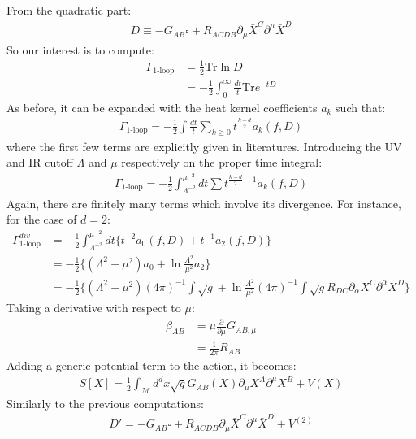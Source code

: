 \documentclass[fleqn]{article}
\begin{document}
From the quadratic part:
\begin{align}
D \equiv -G_{AB} \square + R_{ACDB} \partial _{\mu} \bar{X}^{C} \partial ^{\mu} \bar{X}^{D}
\end{align}
So our interest is to compute:
\begin{align}
\Gamma_{\text{1-loop}} &= \frac{1}{2} \text{Tr} \ln D  \nonumber \\
& = -\frac{1}{2} \int _{0} ^{\infty} \frac{dt}{t} \text{Tr} e^{-tD}
\end{align}
As before, it can be expanded with the heat kernel coefficients $a_{k}$ such that:
\begin{align}
\Gamma _{\text{1-loop}} = -\frac{1}{2} \int \frac{dt}{t} \sum _{k\geq 0} t^{\frac{k-d}{2}}a_{k}(f,D)
\end{align}
where the first few terms are explicitly given in literatures. Introducing the UV and IR cutoff $\Lambda$ and $\mu$ respectively on the proper time integral:
\begin{align}
\Gamma _{\text{1-loop}} = -\frac{1}{2}\int _{\Lambda ^{-2}} ^{\mu ^{-2}} dt \sum t^{\frac{k-d}{2} -1} a_{k}(f,D)
\end{align}
Again, there are finitely many terms which involve its divergence. For instance, for the case of $d=2$:
\begin{align}
\Gamma _{\text{1-loop}}^{div} &= -\frac{1}{2} \int _{\Lambda ^{-2}} ^{\mu ^{-2}} dt\lbrace t^{-2} a_{0} (f,D) + t^{-1} a_{2} (f,D) \rbrace \nonumber \\
&= -\frac{1}{2} \lbrace (\Lambda ^{2} - \mu ^{2} )a_{0} + \ln \frac{\Lambda ^{2}}{\mu ^{2}} a_{2} \rbrace \nonumber \\
&= -\frac{1}{2} \lbrace (\Lambda ^{2} - \mu ^{2})(4\pi)^{-1} \int \sqrt{g} + \ln \frac{\Lambda ^{2}}{\mu ^{2}} (4\pi)^{-1} \int \sqrt{g} R_{DC} \partial _{\alpha} X^{C} \partial ^{\alpha} X^{D} \rbrace 
\end{align}
Taking a derivative with respect to $\mu$:
\begin{align}
\beta _{AB} &= \mu \frac{\partial}{\partial \mu} G_{AB,\mu} \nonumber \\
&=\frac{1}{2\pi} R_{AB} 
\end{align}
Adding a generic potential term to the action, it becomes:
\begin{align}
S[X] =\frac{1}{2} \int _{\mathcal{M}} d^{d}x \sqrt{g} G_{AB}(X) \partial _{\mu}X^{A} \partial^{\mu} X^{B} + V(X)
\end{align}
Similarly to the previous computations:
\begin{align}
D' = -G_{AB} \square + R_{ACDB} \partial _{\mu} \bar{X}^{C} \partial ^{\mu} \bar{X}^{D} + V^{(2)}
\end{align}
\end{document}
